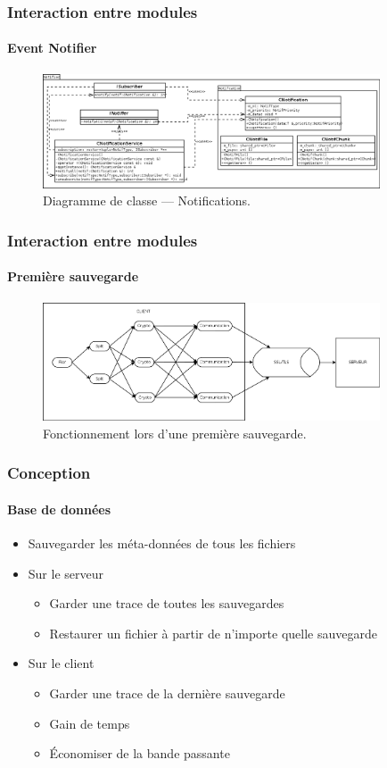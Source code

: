 \documentclass{beamer}
\begin{document}
\begin{frame}
 \frametitle{Interaction entre modules}
 \framesubtitle{Event Notifier}
  \begin{figure}
    \centering
    \includegraphics[width=10cm]{softwareDesign/classDiagramNotif.png}
    \caption{Diagramme de classe --- Notifications.}
  \end{figure}
\end{frame}

\begin{frame}
 \frametitle{Interaction entre modules}
 \framesubtitle{Première sauvegarde}
  \begin{figure}
    \centering
    \includegraphics[width=10cm]{softwareDesign/moduleInteraction.png}
    \caption{Fonctionnement lors d'une première sauvegarde.}
  \end{figure}
\end{frame}

\begin{frame}
 \frametitle{Conception}
 \framesubtitle{Base de données}
 \begin{itemize}
  \item Sauvegarder les méta-données de tous les fichiers
  \item Sur le serveur
  \begin{itemize}
   \item Garder une trace de toutes les sauvegardes
   \item Restaurer un fichier à partir de n'importe quelle sauvegarde
  \end{itemize}
  \item Sur le client
  \begin{itemize}
   \item Garder une trace de la dernière sauvegarde
   \item Gain de temps
   \item Économiser de la bande passante
  \end{itemize}
 \end{itemize}
\end{frame}
\end{document}
